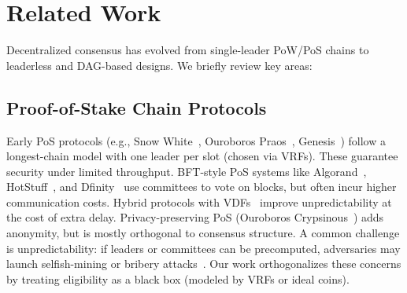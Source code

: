 
\section{Related Work}
\label{sec:related}

\iffalse
Consensus research has evolved along two main lines: chain-based protocols, which analyze linear blockchains via backbone properties such as common prefix, chain growth, and chain quality, and DAG-based protocols, which leverage parallel block production but often lack equally clear invariants. Cryptareon builds on both traditions. From chain-based work we adopt the backbone methodology, but we extend it with DAG-specific invariants (DG, DQ, DCP, TB) to capture concurrency. From DAG-based systems we inherit the advantages of multi-proposer parallelism, but we differ by grounding our design in formal invariants that connect directly to persistence and liveness. This section situates Cryptareon within these two streams of work, highlighting both the conceptual lineage and the novel contributions.
\fi

Decentralized consensus has evolved from single-leader PoW/PoS chains to leaderless and DAG-based designs. We briefly review key areas:

\subsection{Proof-of-Stake Chain Protocols}
Early PoS protocols (e.g., Snow White~\cite{FC:DaiPasShi19}, Ouroboros Praos~\cite{EC:DGKR18}, Genesis~\cite{CCS:BGKRZ18}) follow a longest-chain model with one leader per slot (chosen via VRFs). These guarantee security under limited throughput. BFT-style PoS systems like Algorand~\cite{Algorand}, HotStuff~\cite{HotStuff}, and Dfinity~\cite{Dfinity} use committees to vote on blocks, but often incur higher communication costs. Hybrid protocols with VDFs~\cite{FC:DebCabTse21} improve unpredictability at the cost of extra delay. Privacy-preserving PoS (Ouroboros Crypsinous~\cite{SP:KKKZ19}) adds anonymity, but is mostly orthogonal to consensus structure. A common challenge is unpredictability: if leaders or committees can be precomputed, adversaries may launch selfish-mining or bribery attacks~\cite{FKLTZ24,rationalattacksPOS}. Our work orthogonalizes these concerns by treating eligibility as a black box (modeled by VRFs or ideal coins).

